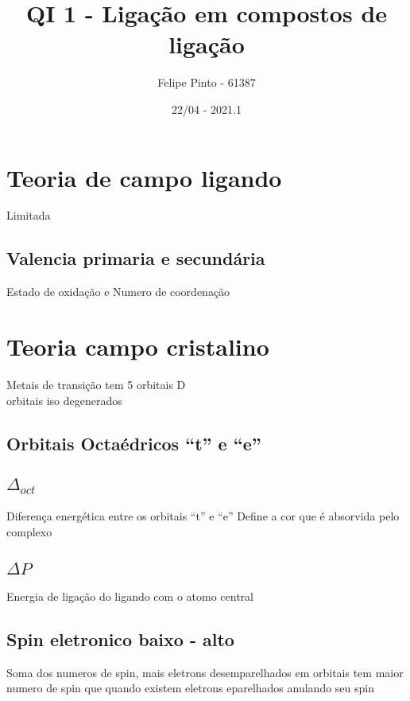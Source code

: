 \documentclass[12pt]{article}
\begin{document}
\title{\bfseries\color{DarkGreen!75!}%
	QI 1 - Ligação em compostos de ligação%
}
\author{Felipe Pinto - 61387}
\date{22/04 - 2021.1}

\maketitle
\tableofcontents
\break



\section{Teoria de campo ligando}
Limitada\\
\subsection{Valencia primaria e secundária}
Estado de oxidação e Numero de coordenação

\section{Teoria campo cristalino}
Metais de transição tem 5 orbitais D\\
orbitais iso degenerados

\subsection{Orbitais Octaédricos ``t'' e ``e''}


\subsection{$\Delta_{oct}$}
Diferença energética entre os orbitais ``t'' e ``e''
Define a cor que é absorvida pelo complexo


\subsection{$\Delta P$}
Energia de ligação do ligando com o atomo central

\subsection{Spin eletronico baixo - alto}
Soma dos numeros de spin, mais eletrons desemparelhados em orbitais tem maior numero de spin que quando existem eletrons eparelhados anulando seu spin
\end{document}
